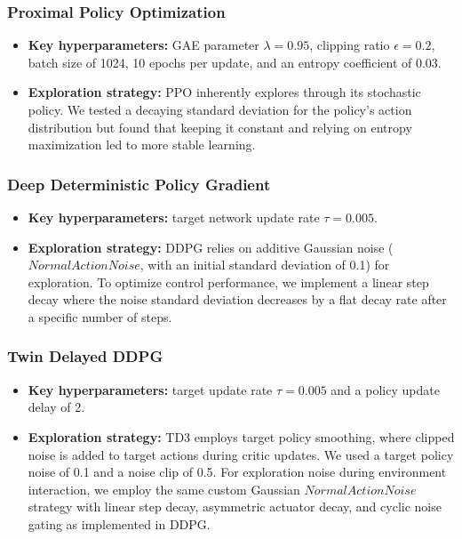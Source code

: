 \documentclass[sn-mathphys,Numbered]{sn-jnl}
\begin{document}
\subsubsection{Proximal Policy Optimization}
\begin{itemize}
    \item \textbf{Key hyperparameters:} GAE parameter $\lambda = 0.95$, clipping ratio $\epsilon = 0.2$, batch size of 1024, 10 epochs per update, and an entropy coefficient of 0.03.
    \item \textbf{Exploration strategy:} PPO inherently explores through its stochastic policy. We tested a decaying standard deviation for the policy’s action distribution but found that keeping it constant and relying on entropy maximization led to more stable learning.
\end{itemize}

\subsubsection{Deep Deterministic Policy Gradient}
\begin{itemize}
    \item \textbf{Key hyperparameters:} target network update rate $\tau = 0.005$.
    \item \textbf{Exploration strategy:} DDPG relies on additive Gaussian noise ($NormalActionNoise$, with an initial standard deviation of 0.1) for exploration. To optimize control performance, we implement a linear step decay where the noise standard deviation decreases by a flat decay rate after a specific number of steps.
\end{itemize}

\subsubsection{Twin Delayed DDPG}
\begin{itemize}
    \item \textbf{Key hyperparameters:} target update rate $\tau = 0.005$ and a policy update delay of 2.
    \item \textbf{Exploration strategy:} TD3 employs target policy smoothing, where clipped noise is added to target actions during critic updates. We used a target policy noise of 0.1 and a noise clip of 0.5. For exploration noise during environment interaction, we employ the same custom Gaussian $NormalActionNoise$ strategy with linear step decay, asymmetric actuator decay, and cyclic noise gating as implemented in DDPG.
\end{itemize}
\end{document}
